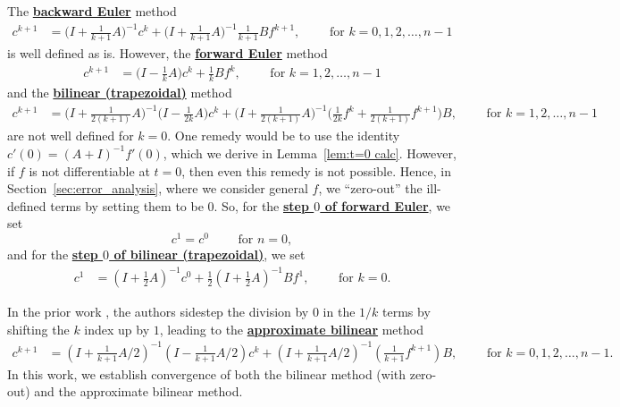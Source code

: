 \documentclass{article}
\theoremstyle{definition}
\newcommand{\pr}[1]{ \left( #1 \right) }
\begin{document}
The \textbf{\underline{backward Euler}} method
\begin{align*}
    c^{k+1} &= \Big(I + \frac{1}{k+1}A\Big)^{-1}c^k + \Big(I + \frac{1}{k+1}A\Big)^{-1} \frac{1}{k+1}  B f^{k+1},
    \qquad\text{ for }k=0,1,2,\dots, n-1
\end{align*}
is well defined as is.
However, the \textbf{\underline{forward Euler}} method
\begin{align*}
    c^{k+1} &= \Big(I - \frac{1}{k}A\Big) c^k + \frac{1}{k}Bf^k,
    \qquad\text{ for }k=1,2,\dots, n-1
\end{align*}
and the \textbf{\underline{bilinear (trapezoidal)}} method
\begin{align*}
    c^{k+1} &= \Big(I + \frac{1}{2(k+1)}A\Big)^{-1} \Big(I - \frac{1}{2k}A\Big)c^k + \Big(I + \frac{1}{2(k+1)}A\Big)^{-1} \Big(\frac{1}{2k}f^k + \frac{1}{2(k+1)}f^{k+1}\Big)B,
    \qquad\text{ for }k=1,2,\dots, n-1
\end{align*}
are not well defined for $k=0$. One remedy would be to use the identity $c'(0) = \pr{A+I}^{-1} f'(0)$, which we derive in Lemma~\ref{lem:t=0 calc}. However, if $f$ is not differentiable at $t=0$, then even this remedy is not possible.
Hence, in Section~\ref{sec:error_analysis}, where we consider general $f$, we ``zero-out'' the ill-defined terms by setting them to be $0$.
So, for the \textbf{\underline{step $0$ of forward Euler}}, we set
\[
c^1 = c^0
    \qquad\text{ for }n=0,
\]
and for the \textbf{\underline{step $0$ of bilinear (trapezoidal)}}, we set
\begin{align*}
    c^{1} &= \pr{I + \frac{1}{2}A}^{-1} c^0 + \frac{1}{2} \pr{I + \frac{1}{2}A}^{-1}Bf^1,
    \qquad\text{ for }k=0.
\end{align*}



In the prior work \cite{gu2020hippo}, the authors sidestep the division by $0$ in the $1/k$ terms by shifting the $k$ index up by $1$, leading to the 
\textbf{\underline{approximate  bilinear}} method
\begin{align*}
    c^{k+1} &= \pr{I + \frac{1}{k+1}A/2}^{-1} \pr{I - \frac{1}{k+1}A/2}c^k + \pr{I + \frac{1}{k+1}A/2}^{-1} \pr{\frac{1}{k+1}f^{k+1}}B,\qquad\text{ for }k=0,1,2,\dots,n-1.
\end{align*}
In this work, we establish convergence of both the bilinear method (with zero-out) and the approximate bilinear method.
\end{document}
